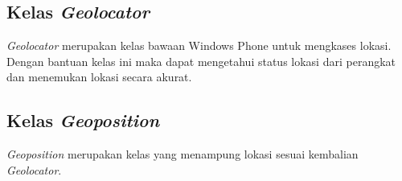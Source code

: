 \subsection{Kelas \textit{Geolocator}}
\label{lab:Kelas Geolocator}
\hspace{0.5cm} \textit{Geolocator} merupakan kelas bawaan Windows Phone untuk mengkases lokasi. Dengan bantuan kelas ini maka dapat mengetahui status lokasi dari perangkat dan menemukan lokasi secara akurat.

\subsection{Kelas \textit{Geoposition}}
\label{lab:Kelas Geoposition}
\hspace{0.5cm} \textit{Geoposition} merupakan kelas yang menampung lokasi sesuai kembalian \textit{Geolocator}.

